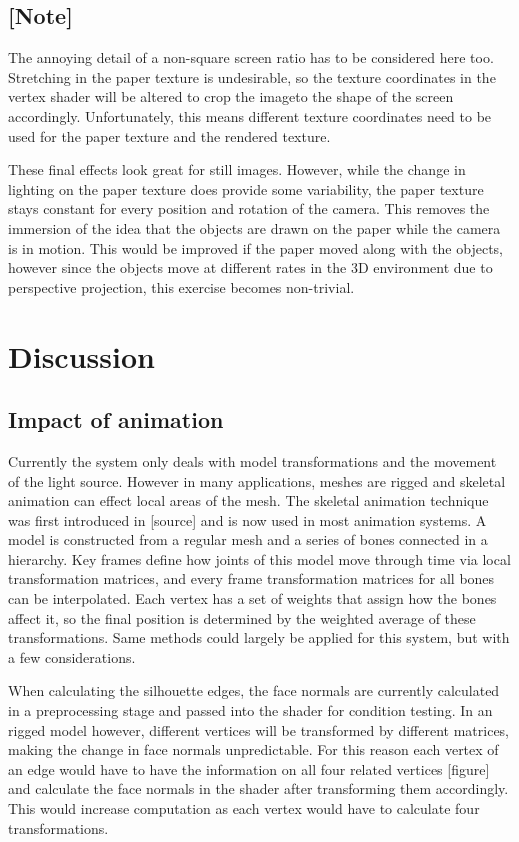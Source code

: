 \documentclass[a4paper, 12pt]{article}
\begin{document}
\subsection{[Note]}
The annoying detail of a non-square screen ratio has to be considered here too. Stretching in the paper texture is undesirable, so the texture coordinates in the vertex shader will be altered to crop the imageto the shape of the screen accordingly. Unfortunately, this means different texture coordinates need to be used for the paper texture and the rendered texture.

These final effects look great for still images. However, while the change in lighting on the paper texture does provide some variability, the paper texture stays constant for every position and rotation of the camera. This removes the immersion of the idea that the objects are drawn on the paper while the camera is in motion. This would be improved if the paper moved along with the objects, however since the objects move at different rates in the 3D environment due to perspective projection, this exercise becomes non-trivial.



\section{Discussion}

\subsection{Impact of animation}
Currently the system only deals with model transformations and the movement of the light source. However in many applications, meshes are rigged and skeletal animation can effect local areas of the mesh. The skeletal animation technique was first introduced in [source] and is now used in most animation systems. A model is constructed from a regular mesh and a series of bones connected in a hierarchy. Key frames define how joints of this model move through time via local transformation matrices, and every frame transformation matrices for all bones can be interpolated. Each vertex has a set of weights that assign how the bones affect it, so the final position is determined by the weighted average of these transformations. Same methods could largely be applied for this system, but with a few considerations.

When calculating the silhouette edges, the face normals are currently calculated in a preprocessing stage and passed into the shader for condition testing. In an rigged model however, different vertices will be transformed by different matrices, making the change in face normals unpredictable. For this reason each vertex of an edge would have to have the information on all four related vertices [figure] and calculate the face normals in the shader after transforming them accordingly. This would increase computation as each vertex would have to calculate four transformations.
\end{document}

